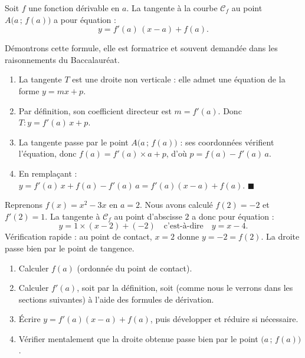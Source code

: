 \documentclass[11pt]{article}
\begin{document}
\begin{propriete}
Soit $f$ une fonction dérivable en $a$. La tangente à la courbe $\mathcal{C}_f$ au point $A\big(a \,;\, f(a)\big)$ a pour équation :
\[ y = f'(a)\,(x - a) + f(a). \]
\end{propriete}

\begin{experience}
Démontrons cette formule, elle est formatrice et souvent demandée dans les raisonnements du Baccalauréat.
\begin{enumerate}
\item La tangente $T$ est une droite non verticale : elle admet une équation de la forme $y = mx + p$.
\item Par définition, son coefficient directeur est $m = f'(a)$. Donc $T : y = f'(a)\,x + p$.
\item La tangente passe par le point $A\big(a \,;\, f(a)\big)$ : ses coordonnées vérifient l'équation, donc $f(a) = f'(a) \times a + p$, d'où $p = f(a) - f'(a)\,a$.
\item En remplaçant : $y = f'(a)\,x + f(a) - f'(a)\,a = f'(a)(x - a) + f(a)$. \quad $\blacksquare$
\end{enumerate}
\end{experience}

\begin{exemplebox}
Reprenons $f(x) = x^2 - 3x$ en $a = 2$. Nous avons calculé $f(2) = -2$ et $f'(2) = 1$. La tangente à $\mathcal{C}_f$ au point d'abscisse $2$ a donc pour équation :
\[ y = 1 \times (x - 2) + (-2) \quad \text{c'est-à-dire} \quad y = x - 4. \]
Vérification rapide : au point de contact, $x = 2$ donne $y = -2 = f(2)$. La droite passe bien par le point de tangence.
\end{exemplebox}

\begin{methode}
\begin{enumerate}
\item Calculer $f(a)$ (ordonnée du point de contact).
\item Calculer $f'(a)$, soit par la définition, soit (comme nous le verrons dans les sections suivantes) à l'aide des formules de dérivation.
\item Écrire $y = f'(a)(x - a) + f(a)$, puis développer et réduire si nécessaire.
\item Vérifier mentalement que la droite obtenue passe bien par le point $\big(a \,;\, f(a)\big)$.
\end{enumerate}
\end{methode}
\end{document}
